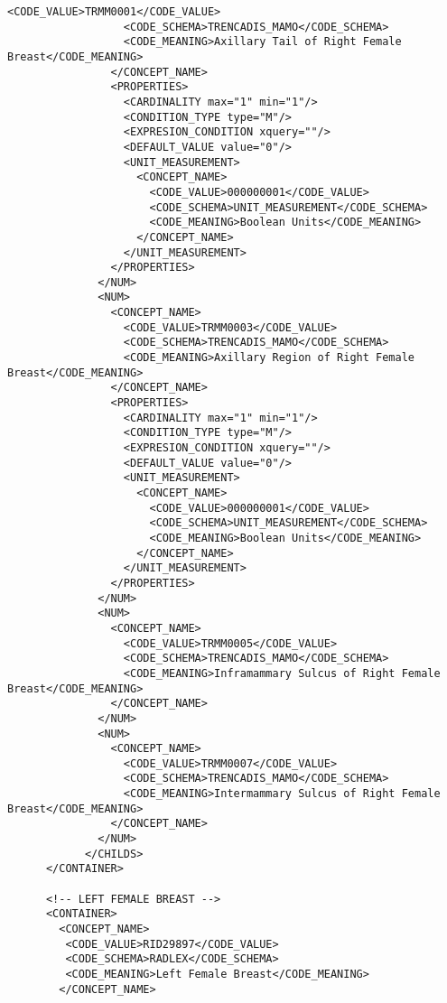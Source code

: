 \begin{lstlisting}[label=dicom-template,caption=Plantilla de un informe estructurado de una exploración de mama]
                  <CODE_VALUE>TRMM0001</CODE_VALUE>
                  <CODE_SCHEMA>TRENCADIS_MAMO</CODE_SCHEMA>
                  <CODE_MEANING>Axillary Tail of Right Female Breast</CODE_MEANING>
                </CONCEPT_NAME>
                <PROPERTIES>
                  <CARDINALITY max="1" min="1"/>
                  <CONDITION_TYPE type="M"/>
                  <EXPRESION_CONDITION xquery=""/>
                  <DEFAULT_VALUE value="0"/>
                  <UNIT_MEASUREMENT>
                    <CONCEPT_NAME>
                      <CODE_VALUE>000000001</CODE_VALUE>
                      <CODE_SCHEMA>UNIT_MEASUREMENT</CODE_SCHEMA>
                      <CODE_MEANING>Boolean Units</CODE_MEANING>
                    </CONCEPT_NAME>
                  </UNIT_MEASUREMENT>
                </PROPERTIES>
              </NUM>
              <NUM>
                <CONCEPT_NAME>
                  <CODE_VALUE>TRMM0003</CODE_VALUE>
                  <CODE_SCHEMA>TRENCADIS_MAMO</CODE_SCHEMA>
                  <CODE_MEANING>Axillary Region of Right Female Breast</CODE_MEANING>
                </CONCEPT_NAME>
                <PROPERTIES>
                  <CARDINALITY max="1" min="1"/>
                  <CONDITION_TYPE type="M"/>
                  <EXPRESION_CONDITION xquery=""/>
                  <DEFAULT_VALUE value="0"/>
                  <UNIT_MEASUREMENT>
                    <CONCEPT_NAME>
                      <CODE_VALUE>000000001</CODE_VALUE>
                      <CODE_SCHEMA>UNIT_MEASUREMENT</CODE_SCHEMA>
                      <CODE_MEANING>Boolean Units</CODE_MEANING>
                    </CONCEPT_NAME>
                  </UNIT_MEASUREMENT>
                </PROPERTIES>
              </NUM>
              <NUM>
                <CONCEPT_NAME>
                  <CODE_VALUE>TRMM0005</CODE_VALUE>
                  <CODE_SCHEMA>TRENCADIS_MAMO</CODE_SCHEMA>
                  <CODE_MEANING>Inframammary Sulcus of Right Female Breast</CODE_MEANING>
                </CONCEPT_NAME>
              </NUM>
              <NUM>
                <CONCEPT_NAME>
                  <CODE_VALUE>TRMM0007</CODE_VALUE>
                  <CODE_SCHEMA>TRENCADIS_MAMO</CODE_SCHEMA>
                  <CODE_MEANING>Intermammary Sulcus of Right Female Breast</CODE_MEANING>
                </CONCEPT_NAME>
              </NUM>
            </CHILDS>
      </CONTAINER>

      <!-- LEFT FEMALE BREAST -->
      <CONTAINER>
        <CONCEPT_NAME>
         <CODE_VALUE>RID29897</CODE_VALUE>
         <CODE_SCHEMA>RADLEX</CODE_SCHEMA>
         <CODE_MEANING>Left Female Breast</CODE_MEANING>
        </CONCEPT_NAME>


\end{lstlisting}
